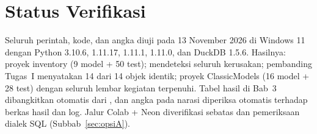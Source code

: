 \section*{Status Verifikasi}
\begin{info}
Seluruh perintah, kode, dan angka diuji pada 13 November 2026 di Windows 11 dengan Python 3.10.6,  1.11.17,  1.11.1,  1.11.0, dan DuckDB 1.5.6. Hasilnya: proyek inventory  (9 model + 50 test);  mendeteksi seluruh kerusakan; pembanding Tugas~I menyatakan 14 dari 14 objek identik; proyek ClassicModels  (16 model + 28 test) dengan seluruh  lembar kegiatan terpenuhi. Tabel hasil di Bab~3 dibangkitkan otomatis dari , dan angka pada narasi diperiksa otomatis terhadap berkas hasil dan log. Jalur Colab + Neon diverifikasi sebatas  dan pemeriksaan dialek SQL (Subbab~\ref{sec:opsiA}).
\end{info}
